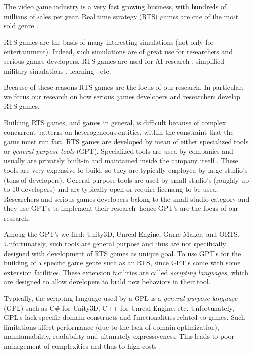 The video game industry is a very fast growing business, with hundreds of millions of sales per year. Real time strategy (RTS) games are one of the most sold genre \cite{claypool2005effect}.

RTS games are the basis of many interesting simulations (not only for entertainment). Indeed, such simulations are of great use for researchers and serious games developers. RTS games are used for AI research \cite{buro2004call}, simplified military simulations \cite{buro2003real}, learning \cite{sharma2007transfer}, etc.

Because of these reasons RTS games are the focus of our research. In particular, we focus our research on how serious games developers and researchers develop RTS games.

Building RTS games, and games in general, is difficult because of complex concurrent patterns on heterogeneous entities, within the constraint that the game must run fast. RTS games are developed by mean of either specialized tools or \textit{general purpose tools} (GPT). Specialized tools are used by companies and usually are privately built-in and maintained inside the company itself \cite{buro2005development}. These tools are very expensive to build, so they are typically employed by large studio's (tens of developers). General purpose tools are used by small studio's (roughly up to 10 developers) and are typically open or require licensing to be used. Researchers and serious games developers belong to the small studio category and they use GPT's to implement their research; hence GPT's are the focus of our research.

Among the GPT's we find: Unity3D, Unreal Engine, Game Maker, and ORTS. Unfortunately, such tools are general purpose and thus are not specifically designed with development of RTS games as unique goal. To use GPT's for the building of a specific game genre such as an RTS, since GPT's come with some extension facilities. These extension facilities are called \textit{scripting languages}, which are designed to allow developers to build new behaviors in their tool.

Typically, the scripting language used by a GPL is a \textit{general purpose language} (GPL) such as C\# for Unity3D, C++ for Unreal Engine, etc. Unfortunately, GPL's lack specific domain constructs and functionalities related to games. Such limitations affect performance (due to the lack of domain optimization), maintainability, readability and ultimately expressiveness. This leads to poor management of complexities and thus to high costs \cite{costs_of_gpls}.

